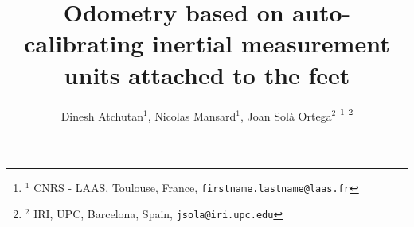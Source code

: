 \documentclass[letterpaper, 10 pt, conference]{ieeeconf}  %
\title{\LARGE \bf
Odometry based on auto-calibrating inertial measurement units attached to the feet
}
\author{Dinesh Atchutan$^{1}$, Nicolas Mansard$^1$, Joan Sol\`a Ortega$^2$%
\thanks{$^{1}$ CNRS - LAAS, Toulouse, France, \tt {\small firstname.lastname@laas.fr}}%
\thanks{$^{2}$ IRI, UPC, Barcelona, Spain, \tt{\small jsola@iri.upc.edu}}
}
\begin{document}
\maketitle
\thispagestyle{empty}
\pagestyle{empty}

\begin{abstract}
\end{abstract}








\end{document}
